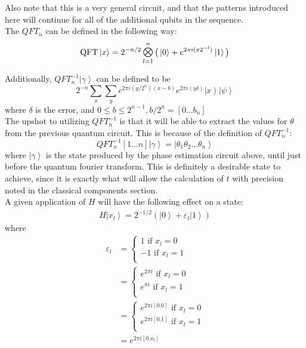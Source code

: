 \documentclass{exam} %
\theoremstyle{plain}
\theoremstyle{definition}
\theoremstyle{remark}
\numberwithin{equation}{section}  %
\renewcommand{\epsilon}{\varepsilon}
\newcommand{\ket}[1]{ \left| #1 \right> }
\DeclareMathOperator*{\Motimes}{\text{\raisebox{0.25ex}{\scalebox{0.8}{$\bigotimes$}}}}
\begin{document}
\begin{enumerate}
  Also note that this is a very general circuit, and that the patterns introduced here will 
  continue for all of the additional qubits in the sequence.\\

  The $QFT_n$ can be defined in the following way:
  \[
    \text{QFT}\ket{x} = 
    2^{-n/2} \Motimes_{l = 1}^{n} \big(\ket{0}+e^{2\pi i(x2^{-l})}\ket{1}\big)
  \]

  Additionally, $QFT_n^{-1}\ket{\gamma}$ can be defined to be
  \[
    2^{-n} \sum_x \sum_y 
    e^{2\pi i(y/2^n)(x-b)}
    e^{2\pi i(y\delta)}
    \ket{x}\ket{\psi}
  \]
  where $\delta$ is the error, and $0 \leq b \leq 2^{n-1}, b/2^n 
  = [0\hdots b_n]$\\ 

  The upshot to utilizing $QFT_n^{-1}$ is that it will be able to 
  extract the values for $\theta$ from the previous quantum circuit. This
  is because of the definition of $QFT_n^{-1}$:
  \[
    QFT_n^{-1}[1\hdots n]\ket{\gamma} = \ket{\theta_1\theta_2\hdots\theta_n}
  \]
  where $\ket{\gamma}$ is the state produced by the phase estimation circuit above, until 
  just before the quantum fourier transform. This is definitely a desirable state to achieve,
  since it is exactly what will allow the calculation of $t$ with precision noted in the
  classical components section.\\

  A given application of $H$ will have the following effect on a state:
  \begin{align*}
    H\ket{x_l} = 2^{-1/2}(\ket{0}+\epsilon_l\ket{1})
  \end{align*}
  where
  \begin{align*}
    \epsilon_l &= 
    \begin{cases}
      1 \text{ if  } x_l = 0\\
      -1 \text{ if } x_l = 1\\
    \end{cases}\\
    &=
    \begin{cases}
      e^{2\pi i} \text{ if  } x_l = 0\\
      e^{\pi i} \text{ if } x_l = 1\\
    \end{cases}\\
    &=
    \begin{cases}
      e^{2\pi i [0.0]} \text{ if  } x_l = 0\\
      e^{2\pi i[0.1]}\text{ if } x_l = 1\\
    \end{cases}\\
    &= e^{2\pi i[0.x_l]}
  \end{align*}
  

\end{enumerate}
\end{document}
